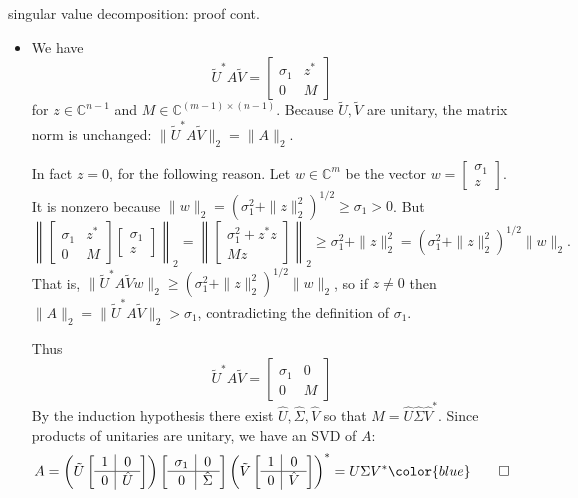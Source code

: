 \documentclass[10pt,hyperref]{beamer}
\newcommand{\CC}{\mathbb{C}}
\newcommand{\ds}{\displaystyle}
\newcommand{\blocktwo}[4]{\left[\begin{array}{c|c} #1 & #2 \\ \hline #3 & #4 \end{array}\right]}
\newcommand{\bqed}{{\color{blue}\qed}}
\begin{document}
\begin{frame}{singular value decomposition: proof cont.}

\begin{itemize}
\footnotesize
\item[\emph{cont.}] We have
    $$\tilde U^*A\tilde V = \blocktwo{\sigma_1}{z^*}{0}{M}$$
for $z\in \CC^{n-1}$ and $M \in \CC^{(m-1)\times(n-1)}$.  Because $\tilde U,\tilde V$ are unitary, the matrix norm is unchanged: $\|\tilde U^*A\tilde V\|_2=\|A\|_2$.

\quad In fact $z=0$, for the following reason.  Let $w\in \CC^m$ be the vector $\ds w = \begin{bmatrix} \sigma_1 \\ z \end{bmatrix}$.  It is nonzero because $\|w\|_2 = (\sigma_1^2 + \|z\|_2^2)^{1/2} \ge \sigma_1>0$.  But
	$$\left\|\blocktwo{\sigma_1}{z^*}{0}{M} \begin{bmatrix} \sigma_1 \\ z \end{bmatrix}\right\|_2 = \left\|\begin{bmatrix} \sigma_1^2 + z^*z \\ Mz \end{bmatrix}\right\|_2 \ge \sigma_1^2 + \|z\|_2^2 = (\sigma_1^2 + \|z\|_2^2)^{1/2} \|w\|_2.$$
That is, $\|\tilde U^*A\tilde V w\|_2 \ge (\sigma_1^2 + \|z\|_2^2)^{1/2} \|w\|_2$, so if $z\ne 0$ then $\|A\|_2=\|\tilde U^*A\tilde V\|_2 > \sigma_1$, contradicting the definition of $\sigma_1$.

\quad Thus 
    $$\tilde U^*A\tilde V = \blocktwo{\sigma_1}{0}{0}{M}$$
By the induction hypothesis there exist $\hat U,\hat\Sigma,\hat V$ so that $M = \hat U \hat\Sigma \hat V^*$.  Since products of unitaries are unitary, we have an SVD of $A$:
    $$A = \left(\tilde U\blocktwo{1}{0}{0}{\hat U}\right) \blocktwo{\sigma_1}{0}{0}{\hat\Sigma} \left(\tilde V \blocktwo{1}{0}{0}{\hat V}\right)^* = U \Sigma V^*\hfill \bqed$$
\normalsize
\end{itemize}
\end{frame}
\end{document}
